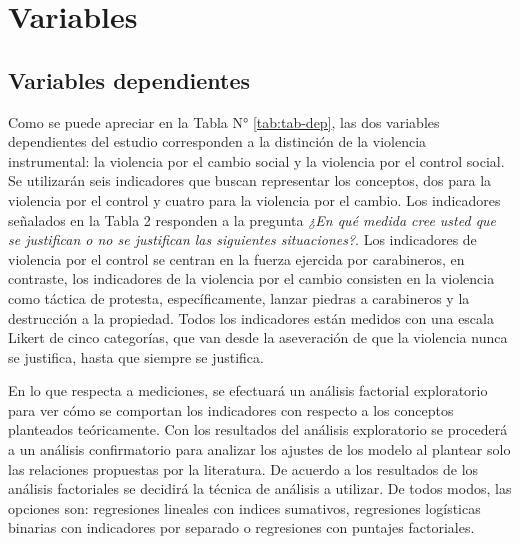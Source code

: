 \documentclass[12pt,twoside]{templates/facsothesis}
\begin{document}
\hypertarget{variables}{%
\section{Variables}\label{variables}}

\hypertarget{variables-dependientes}{%
\subsection{Variables dependientes}\label{variables-dependientes}}

Como se puede apreciar en la Tabla N° \ref{tab:tab-dep}, las dos variables dependientes del estudio corresponden a la distinción de la violencia instrumental: la violencia por el cambio social y la violencia por el control social. Se utilizarán seis indicadores que buscan representar los conceptos, dos para la violencia por el control y cuatro para la violencia por el cambio. Los indicadores señalados en la Tabla 2 responden a la pregunta \emph{¿En qué medida cree usted que se justifican o no se justifican las siguientes situaciones?}. Los indicadores de violencia por el control se centran en la fuerza ejercida por carabineros, en contraste, los indicadores de la violencia por el cambio consisten en la violencia como táctica de protesta, específicamente, lanzar piedras a carabineros y la destrucción a la propiedad. Todos los indicadores están medidos con una escala Likert de cinco categorías, que van desde la aseveración de que la violencia nunca se justifica, hasta que siempre se justifica.

En lo que respecta a mediciones, se efectuará un análisis factorial exploratorio para ver cómo se comportan los indicadores con respecto a los conceptos planteados teóricamente. Con los resultados del análisis exploratorio se procederá a un análisis confirmatorio para analizar los ajustes de los modelo al plantear solo las relaciones propuestas por la literatura. De acuerdo a los resultados de los análisis factoriales se decidirá la técnica de análisis a utilizar. De todos modos, las opciones son: regresiones lineales con indices sumativos, regresiones logísticas binarias con indicadores por separado o regresiones con puntajes factoriales.
\end{document}

